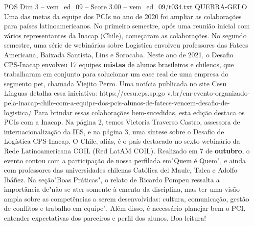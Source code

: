 \begin{textsample}{POS Dim 3 – vem\_ed\_09 – Score 3.00 – vem\_ed\_09/t034.txt}  \label{ex:f3_pos_182}
QUEBRA-GELO Uma das metas da equipe dos PCIs no ano de 2020 foi ampliar as colaborações para países latinoamericanos.
No primeiro semestre, após uma reunião inicial com vários representantes da Inacap (Chile), começaram as colaborações.
No segundo semestre, uma série de webinários sobre Logística envolveu professores das Fatecs Americana, Baixada Santista, Lins e Sorocaba.
Neste ano de 2021, o Desafio CPS-Inacap envolveu 17 equipes \textbf{mistas} de alunos brasileiros e chilenos, que trabalharam em conjunto para solucionar um case real de uma empresa do segmento pet, chamada Viejito Perro.
Uma notícia publicada no site Cesu Línguas detalha essa iniciativa: https://cesu.cps.sp.go v.br/em-evento-organizado-pela-inacap-chile-com-a-equipe-dos-pcis-alunos-de-fatecs-vencem-desafio-de-logistica/ Para brindar essas colaborações bem-sucedidas, esta edição destaca os PCIs com a Inacap.
Na página 2, temos Victoria Traverso Castro, assessora de internacionalização da IES, e na página 3, uma síntese sobre o Desafio de Logística CPS-Inacap.
O Chile, aliás, é o país destacado no sexto webinário da Rede Latinoamericana COIL (Red LatAM COIL).
Realizado em 7 de \textbf{outubro}, o evento contou com a participação de nossa perfilada em"Quem é Quem", e ainda com professores das universidades chilenas Católica del Maule, Talca e Adolfo Ibáñez.
Na seção"Boas Práticas", o relato de Ricardo Pompeu ressalta a importância de"não se ater somente à ementa da disciplina, mas ter uma visão ampla sobre as competências a serem desenvolvidas: cultura, comunicação, gestão de conflitos e trabalho em equipe".
Além disso, é necessário planejar bem o PCI, entender expectativas dos parceiros e perfil dos alunos.
Boa leitura!

\end{textsample}
